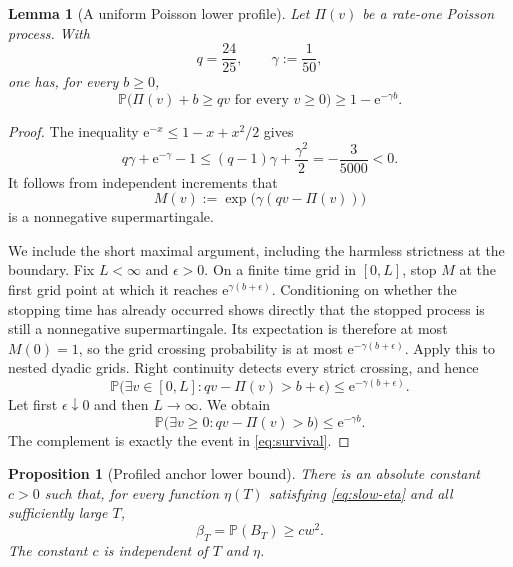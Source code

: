 \documentclass[11pt]{article}
\numberwithin{equation}{section}
\theoremstyle{plain}
\newtheorem{proposition}[theorem]{Proposition}
\newtheorem{lemma}[theorem]{Lemma}
\newcommand{\Pp}{\mathbb P}
\newcommand{\1}{\mathbf 1}
\newcommand{\e}{\mathrm e}
\begin{document}
\begin{lemma}[A uniform Poisson lower profile]\label{lem:poisson-survival}
Let $\Pi(v)$ be a rate-one Poisson process.  With
\[
 q=\frac{24}{25},
 \qquad
 \gamma:=\frac1{50},
\]
one has, for every $b\ge0$,
\begin{equation}\label{eq:survival}
 \Pp\bigl(\Pi(v)+b\ge qv\text{ for every }v\ge0\bigr)
 \ge1-\e^{-\gamma b}.
\end{equation}
\end{lemma}

\begin{proof}
The inequality $\e^{-x}\le1-x+x^2/2$ gives
\[
 q\gamma+\e^{-\gamma}-1
 \le(q-1)\gamma+\frac{\gamma^2}{2}
 =-\frac3{5000}<0.
\]
It follows from independent increments that
\[
 M(v):=\exp\!\bigl(\gamma(qv-\Pi(v))\bigr)
\]
is a nonnegative supermartingale.

We include the short maximal argument, including the harmless strictness at
the boundary.  Fix $L<\infty$ and $\epsilon>0$.  On a finite time grid in
$[0,L]$, stop $M$ at the first grid point at which it reaches
$\e^{\gamma(b+\epsilon)}$.  Conditioning on whether the stopping time has
already occurred shows directly that the stopped process is still a
nonnegative supermartingale.  Its expectation is therefore at most
$M(0)=1$, so the grid crossing probability is at most
$\e^{-\gamma(b+\epsilon)}$.  Apply this to nested dyadic grids.  Right
continuity detects every strict crossing, and hence
\[
 \Pp\bigl(\exists v\in[0,L]:qv-\Pi(v)>b+\epsilon\bigr)
 \le\e^{-\gamma(b+\epsilon)}.
\]
Let first $\epsilon\downarrow0$ and then $L\to\infty$.  We obtain
\[
 \Pp\bigl(\exists v\ge0:qv-\Pi(v)>b\bigr)\le\e^{-\gamma b}.
\]
The complement is exactly the event in \eqref{eq:survival}.
\end{proof}

\begin{proposition}[Profiled anchor lower bound]\label{prop:first-moment}
There is an absolute constant $c>0$ such that, for every function
$\eta(T)$ satisfying \eqref{eq:slow-eta} and all sufficiently large $T$,
\begin{equation}\label{eq:first-moment}
 \beta_T=\Pp(B_T)\ge c w^2.
\end{equation}
The constant $c$ is independent of $T$ and $\eta$.
\end{proposition}
\end{document}
